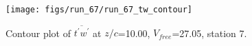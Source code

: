\begin{figure}[H]
\centering
\texttt{[image: figs/run\_67/run\_67\_tw\_contour]}
\caption{Contour plot of $\overline{t^\prime w^\prime}$ at $z/c$=10.00, $V_{free}$=27.05, station 7.}
\end{figure}


